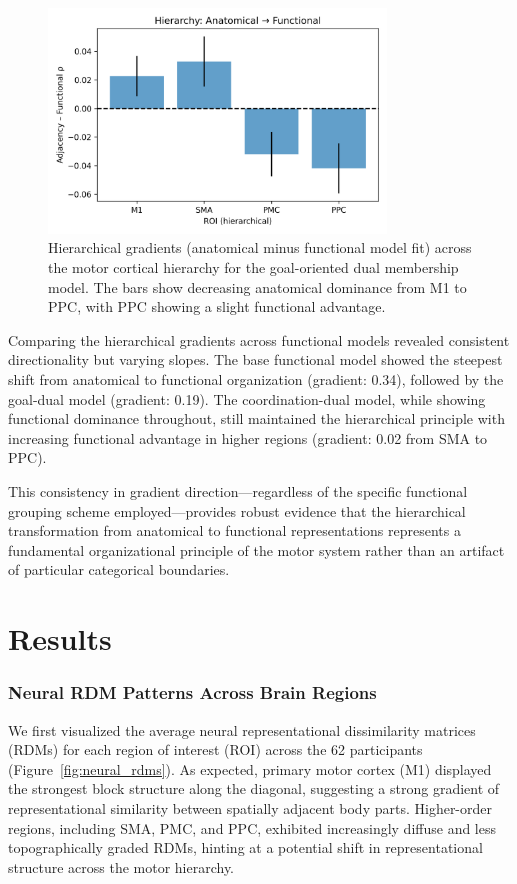 \documentclass{article}
\begin{document}
\begin{figure}[!htbp]
\centering
\includegraphics[width=0.8\textwidth]{results/goal_dual/hierarchy_adjacency_vs_functional.png}
\caption{Hierarchical gradients (anatomical minus functional model fit) across the motor cortical hierarchy for the goal-oriented dual membership model. The bars show decreasing anatomical dominance from M1 to PPC, with PPC showing a slight functional advantage.}
\label{fig:hierarchy_gradients}
\end{figure}

Comparing the hierarchical gradients across functional models revealed consistent directionality but varying slopes. The base functional model showed the steepest shift from anatomical to functional organization (gradient: 0.34), followed by the goal-dual model (gradient: 0.19). The coordination-dual model, while showing functional dominance throughout, still maintained the hierarchical principle with increasing functional advantage in higher regions (gradient: 0.02 from SMA to PPC).

This consistency in gradient direction—regardless of the specific functional grouping scheme employed—provides robust evidence that the hierarchical transformation from anatomical to functional representations represents a fundamental organizational principle of the motor system rather than an artifact of particular categorical boundaries.

\section{Results}
\subsubsection{Neural RDM Patterns Across Brain Regions}
We first visualized the average neural representational dissimilarity matrices (RDMs) for each region of interest (ROI) across the 62 participants (Figure~\ref{fig:neural_rdms}). As expected, primary motor cortex (M1) displayed the strongest block structure along the diagonal, suggesting a strong gradient of representational similarity between spatially adjacent body parts. Higher-order regions, including SMA, PMC, and PPC, exhibited increasingly diffuse and less topographically graded RDMs, hinting at a potential shift in representational structure across the motor hierarchy.
\end{document}
